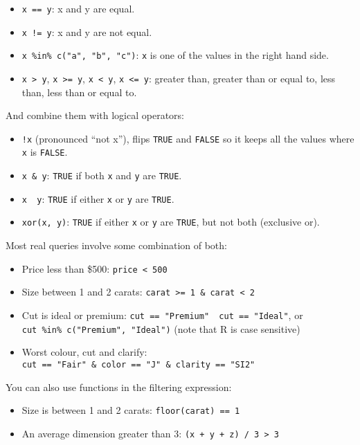 \begin{itemize}
\tightlist
\item
  \texttt{x\ ==\ y}: x and y are equal.
\item
  \texttt{x\ !=\ y}: x and y are not equal.
\item
  \texttt{x\ \%in\%\ c("a",\ "b",\ "c")}: \texttt{x} is one of the
  values in the right hand side.
\item
  \texttt{x\ \textgreater{}\ y}, \texttt{x\ \textgreater{}=\ y},
  \texttt{x\ \textless{}\ y}, \texttt{x\ \textless{}=\ y}: greater than,
  greater than or equal to, less than, less than or equal to.
\end{itemize}

And combine them with logical operators:

\begin{itemize}
\tightlist
\item
  \texttt{!x} (pronounced ``not x''), flips \texttt{TRUE} and
  \texttt{FALSE} so it keeps all the values where \texttt{x} is
  \texttt{FALSE}.
\item
  \texttt{x\ \&\ y}: \texttt{TRUE} if both \texttt{x} and \texttt{y} are
  \texttt{TRUE}.
\item
  \texttt{x\ \textbar{}\ y}: \texttt{TRUE} if either \texttt{x} or
  \texttt{y} are \texttt{TRUE}.
\item
  \texttt{xor(x,\ y)}: \texttt{TRUE} if either \texttt{x} or \texttt{y}
  are \texttt{TRUE}, but not both (exclusive or).
\end{itemize}

Most real queries involve some combination of both:

\begin{itemize}
\tightlist
\item
  Price less than \$500: \texttt{price\ \textless{}\ 500}
\item
  Size between 1 and 2 carats:
  \texttt{carat\ \textgreater{}=\ 1\ \&\ carat\ \textless{}\ 2}
\item
  Cut is ideal or premium:
  \texttt{cut\ ==\ "Premium"\ \textbar{}\ cut\ ==\ "Ideal"}, or
  \texttt{cut\ \%in\%\ c("Premium",\ "Ideal")} (note that R is case
  sensitive)
\item
  Worst colour, cut and clarify:
  \texttt{cut\ ==\ "Fair"\ \&\ color\ ==\ "J"\ \&\ clarity\ ==\ "SI2"}
\end{itemize}

You can also use functions in the filtering expression:

\begin{itemize}
\tightlist
\item
  Size is between 1 and 2 carats: \texttt{floor(carat)\ ==\ 1}
\item
  An average dimension greater than 3:
  \texttt{(x\ +\ y\ +\ z)\ /\ 3\ \textgreater{}\ 3}
\end{itemize}

